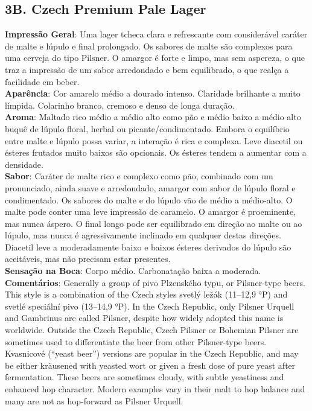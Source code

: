\subsection*{3B. Czech Premium Pale Lager}
\textbf{Impressão Geral}: Uma lager tcheca clara e refrescante com considerável caráter de malte e lúpulo e final prolongado. Os sabores de malte são complexos para uma cerveja do tipo Pilsner. O amargor é forte e limpo, mas sem aspereza, o que traz a impressão de um sabor arredondado e bem equilibrado, o que realça a facilidade em beber. \\
\textbf{Aparência}: Cor amarelo médio a dourado intenso. Claridade brilhante a muito límpida. Colarinho branco, cremoso e denso de longa duração. \\
\textbf{Aroma}: Maltado rico médio a médio alto como pão e médio baixo a médio alto buquê de lúpulo floral, herbal ou picante/condimentado. Embora o equilíbrio entre malte e lúpulo possa variar, a interação é rica e complexa. Leve diacetil ou ésteres frutados muito baixos são opcionais. Os ésteres tendem a aumentar com a densidade. \\
\textbf{Sabor}: Caráter de malte rico e complexo como pão, combinado com um pronunciado, ainda suave e arredondado, amargor com sabor de lúpulo floral e condimentado. Os sabores do malte e do lúpulo vão de médio a médio-alto. O malte pode conter uma leve impressão de caramelo. O amargor é proeminente, mas nunca áspero. O final longo pode ser equilibrado em direção ao malte ou ao lúpulo, mas nunca é agressivamente inclinado em qualquer destas direções. Diacetil leve a moderadamente baixo e baixos ésteres derivados do lúpulo são aceitáveis, mas não precisam estar presentes. \\
\textbf{Sensação na Boca}: Corpo médio. Carbonatação baixa a moderada. \\
\textbf{Comentários}: Generally a group of pivo Plzenského typu, or Pilsner-type beers. This style is a combination of the Czech styles svetlý ležák (11–12,9 °P) and svetlé speciální pivo (13–14,9 °P). In the Czech Republic, only Pilsner Urquell and Gambrinus are called Pilsner, despite how widely adopted this name is worldwide. Outside the Czech Republic, Czech Pilsner or Bohemian Pilsner are sometimes used to differentiate the beer from other Pilsner-type beers. Kvasnicové (“yeast beer”) versions are popular in the Czech Republic, and may be either kräusened with yeasted wort or given a fresh dose of pure yeast after fermentation. These beers are sometimes cloudy, with subtle yeastiness and enhanced hop character. Modern examples vary in their malt to hop balance and many are not as hop-forward as Pilsner Urquell. \\
